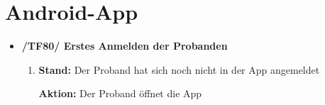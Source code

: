 \documentclass[a4paper]{scrreprt}
\begin{document}
	      \section{Android-App}
              \begin{itemize}
                  \item \textbf{/TF80/ Erstes Anmelden der Probanden}
                  \begin{enumerate}
                        \item \par \textbf{Stand: }Der Proband hat sich noch nicht in der App angemeldet
                        \par \textbf{Aktion: }Der Proband öffnet die App
                        \par {}


\end{enumerate}
\end{itemize}
\end{document}
